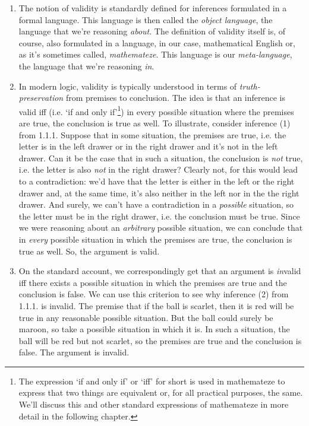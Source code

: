 \begin{enumerate}[\thesection.1]
	\item \label{intro:valid:math2} The notion of validity is standardly defined for inferences formulated in a formal language. This language is then called the \emph{object language}, the language that we're reasoning \emph{about}. The definition of validity itself is, of course, also formulated in a language, in our case, mathematical English or, as it's sometimes called, \emph{mathemateze}. This language is our \emph{meta-language}, the language that we're reasoning \emph{in}. 
	
	\item \label{intro:valid:valid} In modern logic, validity is typically understood in terms of \emph{truth-preservation} from premises to conclusion. The idea is that an inference is valid iff (i.e. `if and only if'\footnote{The expression `if and only if' or `iff' for short is used in mathemateze to express that two things are equivalent or, for all practical purposes, the same. We'll discuss this and other standard expressions of mathemateze in more detail in the following chapter.}) in every possible situation where the premises are true, the conclusion is true as well. To illustrate, consider inference (1) from 1.1.1. Suppose that in some situation, the premises are true, i.e. the letter is in the left drawer or in the right drawer and it's not in the left drawer. Can it be the case that in such a situation, the conclusion is \emph{not} true, i.e. the letter is also \emph{not} in the right drawer? Clearly not, for this would lead to a contradiction: we'd have that the letter is either in the left or the right drawer and, at the same time, it's also neither in the left nor in the the right drawer. And surely, we can't have a contradiction in a \emph{possible} situation, so the letter must be in the right drawer, i.e. the conclusion must be true. Since we were reasoning about an \emph{arbitrary} possible situation, we can conclude that in \emph{every} possible situation in which the premises are true, the conclusion is true as well. So, the argument is valid.
	
	\item On the standard account, we correspondingly get that an argument is \emph{in}valid iff there exists a possible situation in which the premises are true and the conclusion is false. We can use this criterion to see why inference (2) from 1.1.1. is invalid. The premise that if the ball is scarlet, then it is red will be true in any reasonable possible situation. But the ball could surely be maroon, so take a possible situation in which it is. In such a situation, the ball will be red but not scarlet, so the premises are true and the conclusion is false. The argument is invalid.
	

\end{enumerate}
